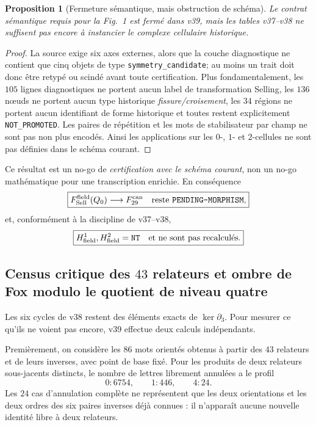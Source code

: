 \documentclass[11pt,a4paper]{article}
\newtheorem{proposition}[theorem]{Proposition}
\newcommand{\certPending}{\texttt{PENDING-MORPHISM}}
\newcommand{\certNT}{\texttt{NT}}
\begin{document}
\begin{proposition}[Fermeture sémantique, mais obstruction de schéma]
Le contrat sémantique requis pour la Fig.~1 est fermé dans v39, mais les tables v37--v38 ne suffisent pas encore à instancier le complexe cellulaire historique.
\end{proposition}
\begin{proof}
La source exige six axes externes, alors que la couche diagnostique ne contient que cinq objets de type \texttt{symmetry\_candidate}; au moins un trait doit donc être retypé ou scindé avant toute certification. Plus fondamentalement, les $105$ lignes diagnostiques ne portent aucun label de transformation Selling, les $136$ nœuds ne portent aucun type historique \emph{fissure/croisement}, les $34$ régions ne portent aucun identifiant de forme historique et toutes restent explicitement \texttt{NOT\_PROMOTED}. Les paires de répétition et les mots de stabilisateur par champ ne sont pas non plus encodés. Ainsi les applications sur les $0$-, $1$- et $2$-cellules ne sont pas définies dans le schéma courant.
\end{proof}

Ce résultat est un no-go de \emph{certification avec le schéma courant}, non un no-go mathématique pour une transcription enrichie. En conséquence
\[
 \boxed{F_{\rm Sell}^{\rm field}(Q_0)\longrightarrow F_{29}^{\rm can}
 \quad\text{reste }\certPending,}
\]
et, conformément à la discipline de v37--v38,
\[
 \boxed{H^1_{\rm field},H^2_{\rm field}=\certNT\quad\text{et ne sont pas recalculés}.}
\]

\subsection{Census critique des $43$ relateurs et ombre de Fox modulo le quotient de niveau quatre}

Les six cycles de v38 restent des éléments exacts de $\ker\partial_3$. Pour mesurer ce qu'ils ne voient pas encore, v39 effectue deux calculs indépendants.

Premièrement, on considère les $86$ mots orientés obtenus à partir des $43$ relateurs et de leurs inverses, avec point de base fixé. Pour les produits de deux relateurs sous-jacents distincts, le nombre de lettres librement annulées a le profil
\[
 \boxed{0:6754,\qquad 1:446,\qquad 4:24.}
\]
Les $24$ cas d'annulation complète ne représentent que les deux orientations et les deux ordres des six paires inverses déjà connues : il n'apparaît aucune nouvelle identité libre à deux relateurs.
\end{document}
